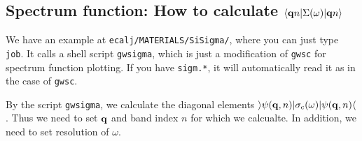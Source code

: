\documentclass[a4paper,10pt,epsf,fleqn]{article}
\newcommand{\bfq}{{\bf q}}
\begin{document}



\subsection{Spectrum function: How to calculate $\langle \bfq n|\Sigma(\omega)|\bfq n\rangle$}
We have an example at {\tt ecalj/MATERIALS/SiSigma/}, where
you can just type {\tt job}. It calls a shell script {\tt gwsigma}, which is
just a modification of {\tt gwsc} for spectrum function plotting.
If you have {\tt sigm.*}, it will automatically read it as in the case
of {\tt gwsc}.

By the script {\tt gwsigma}, we calculate the diagonal elements
$\rangle \psi(\bfq,n)|\sigma_{\rm c}(\omega) |\psi(\bfq,n)\langle$.
Thus we need to set $\bfq$ and band index $n$ for which we calcualte.
In addition, we need to set resolution of $\omega$.
\end{document}
